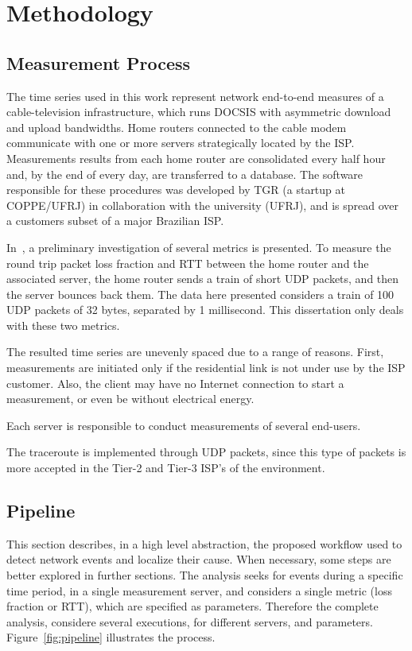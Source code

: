 \chapter{Methodology}
\label{chap:methodology}

\section{Measurement Process}

The time series used in this work represent network end-to-end measures of a
cable-television infrastructure, which runs DOCSIS with asymmetric download and
upload bandwidths. Home routers connected to the cable modem communicate with
one or more servers strategically located by the ISP\@. Measurements results
from
each home router are consolidated every half hour and, by the end of every day,
are transferred to a database. The software responsible for these procedures was
developed by TGR (a startup at COPPE/UFRJ) in collaboration with the university
(UFRJ), and is spread over a customers subset of a major Brazilian ISP\@.

In~\cite{a_preliminary_performance_measurement_study_of_residential_broadband_services_in_brazil},
a preliminary investigation of several metrics is presented. To measure the
round
trip packet loss fraction and RTT between the home router and the associated
server, the
home router sends a train of short UDP packets, and then the server bounces back
them. The data here presented considers a train of 100 UDP packets of 32 bytes,
separated by 1 millisecond. This dissertation only deals with these two
metrics.

The resulted time series are unevenly spaced due to a range of reasons. First,
measurements are initiated only if the residential link is not under use by the
ISP customer. Also, the client may have no Internet connection to start a
measurement, or even be without electrical energy.

Each server is responsible to conduct measurements of several end-users.

The traceroute is implemented through UDP packets, since this type of packets
is more accepted in the Tier-2 and Tier-3 ISP's of the environment.

\section{Pipeline}

This section describes, in a high level abstraction, the proposed workflow
used to detect network events and localize their cause. When necessary, some
steps are better explored in further sections.
The analysis seeks for events during a specific time period, in a single
measurement server, and considers a
single metric (loss fraction or RTT), which are specified as parameters.
Therefore the complete analysis, considere several executions, for different
servers, and parameters.
Figure~\ref{fig:pipeline} illustrates the process.

